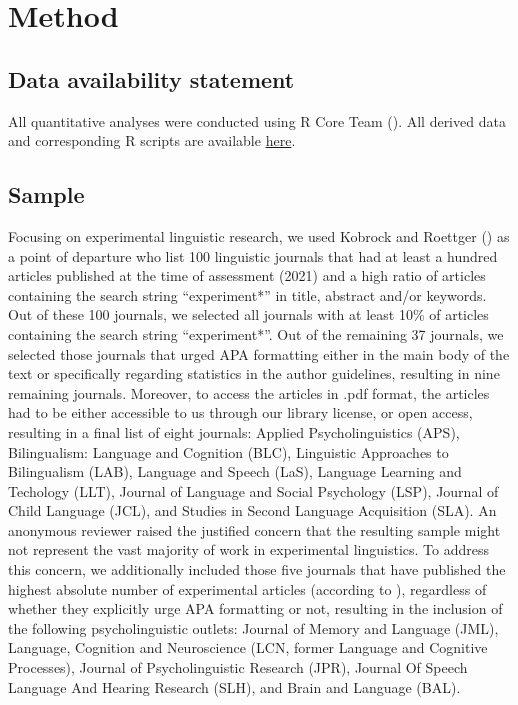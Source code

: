 \documentclass[
  doc,
  longtable,
  nolmodern,
  notxfonts,
  notimes,
  colorlinks=true,linkcolor=blue,citecolor=blue,urlcolor=blue]{apa7}
\begin{document}
\section{Method}\label{method}

\subsection{Data availability
statement}\label{data-availability-statement}

All quantitative analyses were conducted using R Core Team
(). All derived data and corresponding R
scripts are available
\href{https://osf.io/gx3ub/?view_only=25957e06b5f449d6820b529eb0ae1937}{here}.

\subsection{Sample}\label{sample}

Focusing on experimental linguistic research, we used Kobrock and
Roettger () as a point of
departure who list 100 linguistic journals that had at least a hundred
articles published at the time of assessment (2021) and a high ratio of
articles containing the search string ``experiment*'' in title, abstract
and/or keywords. Out of these 100 journals, we selected all journals
with at least 10\% of articles containing the search string
``experiment*''. Out of the remaining 37 journals, we selected those
journals that urged APA formatting either in the main body of the text
or specifically regarding statistics in the author guidelines, resulting
in nine remaining journals. Moreover, to access the articles in .pdf
format, the articles had to be either accessible to us through our
library license, or open access, resulting in a final list of eight
journals: Applied Psycholinguistics (APS), Bilingualism: Language and
Cognition (BLC), Linguistic Approaches to Bilingualism (LAB), Language
and Speech (LaS), Language Learning and Techology (LLT), Journal of
Language and Social Psychology (LSP), Journal of Child Language (JCL),
and Studies in Second Language Acquisition (SLA). An anonymous reviewer
raised the justified concern that the resulting sample might not
represent the vast majority of work in experimental linguistics. To
address this concern, we additionally included those five journals that
have published the highest absolute number of experimental articles
(according to ), regardless of whether they explicitly urge APA formatting or
not, resulting in the inclusion of the following psycholinguistic
outlets: Journal of Memory and Language (JML), Language, Cognition and
Neuroscience (LCN, former Language and Cognitive Processes), Journal of
Psycholinguistic Research (JPR), Journal Of Speech Language And Hearing
Research (SLH), and Brain and Language (BAL).
\end{document}
